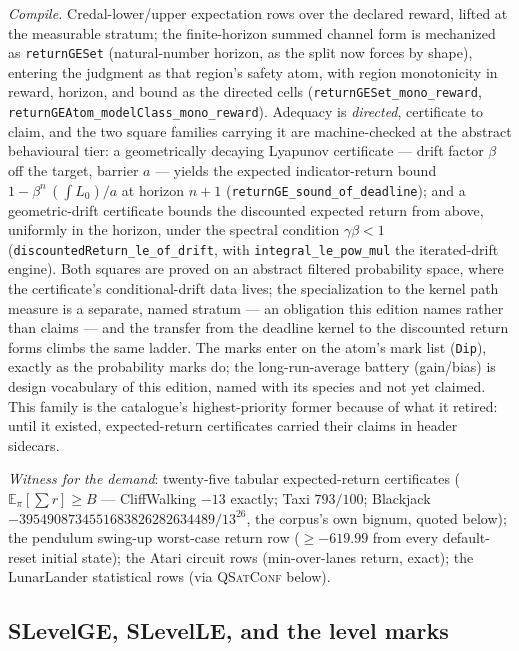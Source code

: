 \emph{Compile.} Credal-lower/upper expectation rows over the
declared reward, lifted at the measurable stratum; the
finite-horizon summed channel form is mechanized as
\texttt{returnGESet} (natural-number horizon, as the split now
forces by shape), entering the judgment as that region's safety
atom, with region monotonicity in reward, horizon, and bound as the
directed cells (\texttt{returnGESet\_mono\_reward},
\texttt{returnGEAtom\_modelClass\_mono\_reward}). Adequacy is
\emph{directed}, certificate to claim, and the two square families
carrying it are machine-checked at the abstract behavioural tier: a
geometrically decaying Lyapunov certificate --- drift factor $\beta$
off the target, barrier $a$ --- yields the expected indicator-return
bound $1 - \beta^{n}\,(\int L_0)/a$ at horizon $n{+}1$
(\texttt{returnGE\_sound\_of\_deadline}); and a geometric-drift
certificate bounds the discounted expected return from above,
uniformly in the horizon, under the spectral condition
$\gamma\beta < 1$ (\texttt{discountedReturn\_le\_of\_drift}, with
\texttt{integral\_le\_pow\_mul} the iterated-drift engine). Both
squares are proved on an abstract filtered probability space,
where the certificate's conditional-drift data lives; the
specialization to the kernel path measure is a separate, named
stratum --- an obligation this edition names rather than claims ---
and the transfer from the deadline kernel to the discounted return
forms climbs the same ladder. The marks enter on the atom's mark
list (\texttt{Dip}), exactly as the probability marks do; the
long-run-average battery (gain/bias) is design vocabulary of this
edition, named with its species and not yet claimed. This family is
the catalogue's highest-priority former because of what
it retired: until it existed, expected-return certificates carried
their claims in header sidecars.

\emph{Witness for the demand}: twenty-five tabular expected-return
certificates ($\mathbb{E}_\pi[\sum r] \ge B$ --- CliffWalking $-13$
exactly; Taxi $793/100$; Blackjack
$-3954908734551683826282634489/13^{26}$, the corpus's own bignum,
quoted below); the pendulum swing-up worst-case return row ($\ge
-619.99$ from every default-reset initial state); the Atari circuit
rows (min-over-lanes return, exact); the LunarLander statistical rows
(via \textsc{QSatConf} below).



\subsection{SLevelGE, SLevelLE, and the level marks}
\label{sec:spec-lang-level}

